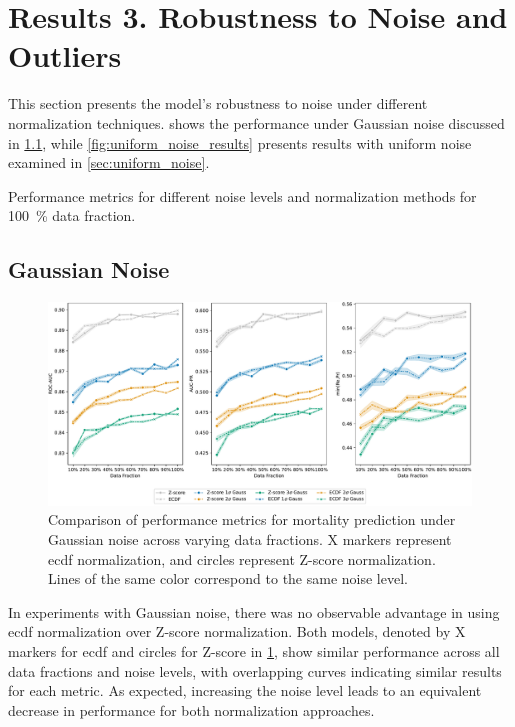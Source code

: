 \section{Results 3. Robustness to Noise and Outliers}

This section presents the model's robustness to noise under different normalization techniques.  shows the performance under Gaussian noise discussed in \cref{sec:gaussian_noise}, while \cref{fig:uniform_noise_results} presents results with uniform noise examined in \cref{sec:uniform_noise}.



\begin{table}

\caption{Performance metrics for different noise levels and normalization methods for \qty{100}{\percent} data fraction.}
\label{tab:noise_experiments}
\end{table}

\subsection{Gaussian Noise}
\label{sec:gaussian_noise}

\begin{figure}
    \centering
    \includegraphics[width=\textwidth]{./figures/gaussian_noise_results}
    \caption{Comparison of performance metrics for mortality prediction under Gaussian noise across varying data fractions. X markers represent \gls{ecdf} normalization, and circles represent Z-score normalization. Lines of the same color correspond to the same noise level.}
    \label{fig:gaussian_noise_results}
\end{figure}


In experiments with Gaussian noise, there was no observable advantage in using \gls{ecdf} normalization over Z-score normalization. Both models, denoted by X markers for \gls{ecdf} and circles for Z-score in \cref{fig:gaussian_noise_results}, show similar performance across all data fractions and noise levels, with overlapping curves indicating similar results for each metric. As expected, increasing the noise level leads to an equivalent decrease in performance for both normalization approaches.

